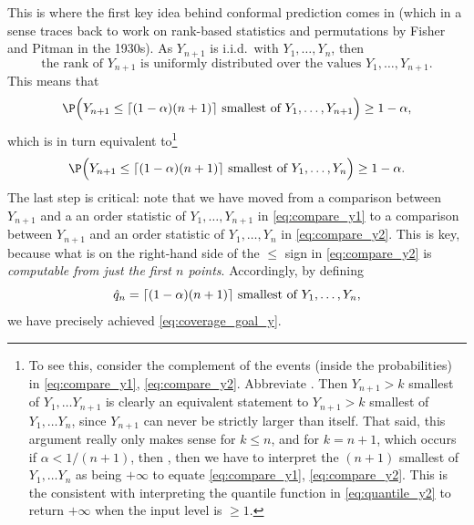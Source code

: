 \documentclass{article}
\begin{document}
This is where the first key idea behind conformal prediction comes in (which in
a sense traces back to work on rank-based statistics and permutations by Fisher
and Pitman in the 1930s). As $Y_{n+1}$ is i.i.d.\ with $Y_1,\dots,Y_n$, then  
\begin{equation}
\label{eq:rank_uniform_y}
\text{the rank of $Y_{n+1}$ is uniformly distributed over the values 
  $Y_1,\dots,Y_{n+1}$}.
\end{equation}
This means that 
\begin{equation}
\label{eq:compare_y1}
\P\Big( \text{$Y_{n+1} \leq \lceil (1-\alpha)(n+1) \rceil$ smallest of
  $Y_1,\dots,Y_{n+1}$} \Big) \geq 1-\alpha,
\end{equation}
which is in turn equivalent to\footnote{To see this, consider the complement of
  the events (inside the probabilities) in \eqref{eq:compare_y1},
  \eqref{eq:compare_y2}. Abbreviate . Then  $Y_{n+1} > k$ smallest of $Y_1, \dots Y_{n+1}$ is clearly an
  equivalent statement to $Y_{n+1} > k$ smallest of $Y_1, \dots Y_n$, since
  $Y_{n+1}$ can never be strictly larger than itself. That said, this argument
  really only makes sense for $k \leq n$, and for $k = n+1$, which occurs if
  $\alpha < 1/(n+1)$, then , then
  we have to  interpret the $(n+1)$ smallest of $Y_1, \dots Y_n$ as being
  $+\infty$ to equate \eqref{eq:compare_y1}, \eqref{eq:compare_y2}. This is the
  consistent with interpreting the quantile function in \eqref{eq:quantile_y2}
  to return $+\infty$ when the input level is $\geq 1$.}      
\begin{equation}
\label{eq:compare_y2}
\P\Big( \text{$Y_{n+1} \leq \lceil (1-\alpha)(n+1) \rceil$ smallest of
  $Y_1,\dots,Y_n$} \Big) \geq 1-\alpha.
\end{equation}
The last step is critical: note that we have moved from a comparison between 
$Y_{n+1}$ and a an order statistic of $Y_1,\dots,Y_{n+1}$ in
\eqref{eq:compare_y1} to a comparison between $Y_{n+1}$ and an order statistic
of $Y_1,\dots,Y_n$ in \eqref{eq:compare_y2}. This is key, because what is on the
right-hand side of the $\leq$ sign in \eqref{eq:compare_y2} is \emph{computable
  from just the first $n$ points}. Accordingly, by defining  
\begin{equation}
\label{eq:quantile_y1}
\text{$\hat{q}_n = \lceil (1-\alpha)(n+1) \rceil$ smallest of $Y_1,\dots,Y_n$}, 
\end{equation}
we have precisely achieved \eqref{eq:coverage_goal_y}. 
\end{document}
